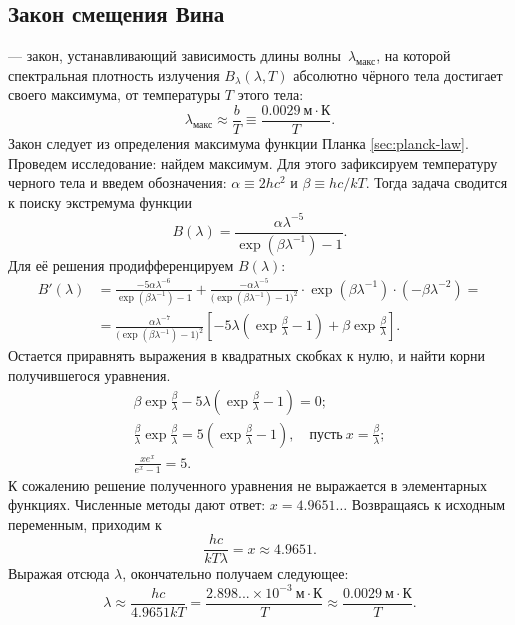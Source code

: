 \subsection{Закон смещения Вина}
 --- закон, устанавливающий зависимость длины волны~$\lambda_\text{макс}$, на которой спектральная плотность излучения $B_\lambda(\lambda, T)$ абсолютно чёрного тела достигает своего максимума, от температуры $T$ этого тела:
\begin{equation}
	\lambda_\text{макс} \approx \frac{b}{T} \equiv \frac{0.0029~\text{м} \cdot \text{К}}{T}.
\end{equation}
Закон следует из определения максимума функции Планка \eqref{sec:planck-law}.
Проведем исследование: найдем максимум. Для этого зафиксируем температуру черного тела и введем обозначения: $\alpha \equiv 2 h c^2$ и $\beta \equiv h c / k T$. Тогда задача сводится к поиску экстремума функции
\begin{equation*}
	B(\lambda) = \frac{\alpha \lambda^{-5}}{\exp \left(\beta \lambda^{-1} \right) - 1}.
\end{equation*}
Для её решения продифференцируем $B(\lambda)$:
\begin{align*}
	B'(\lambda) &= \frac{-5 \alpha \lambda^{-6}}{\exp \left(\beta \lambda^{-1} \right) - 1} + \frac{-\alpha \lambda^{-5}}{\big(\exp \left(\beta \lambda^{-1} \right) - 1\big)^2} \cdot \exp \left( \beta \lambda^{-1} \right) \cdot \left(-\beta \lambda^{-2}\right) = \\
	&= \frac{\alpha \lambda^{-7}}{\big(\exp \left(\beta \lambda^{-1} \right) - 1\big)^2} \left[ -5\lambda \left( \exp \frac{\beta}{\lambda} - 1 \right) + \beta \exp \frac{\beta}{\lambda} \right].
\end{align*}
Остается приравнять выражения в квадратных скобках к нулю, и найти корни получившегося уравнения.
\begin{gather*}
	\beta \exp \frac{\beta}{\lambda} - 5\lambda \left( \exp \frac{\beta}{\lambda} - 1 \right) = 0;\\
	\frac{\beta}{\lambda} \exp \frac{\beta}{\lambda} = 5 \left( \exp \frac{\beta}{\lambda} - 1 \right),\quad\text{пусть}~x = \frac{\beta}{\lambda};\\
	\frac{x e^x}{e^x - 1} = 5.
\end{gather*}
К сожалению решение полученного уравнения не выражается в элементарных функциях. Численные методы дают ответ: $x = 4.9651\ldots$ Возвращаясь к исходным переменным, приходим к
\begin{equation*}
	\frac{h c}{k T \lambda} = x \approx 4.9651.
\end{equation*}
Выражая отсюда $\lambda$, окончательно получаем следующее:
\begin{equation*}
	\lambda \approx \frac{h c}{4.9651 k T} = \frac{2.898... \times 10^{-3}~\text{м}\cdot\text{К}}{T} \approx  \frac{0.0029~\text{м} \cdot \text{К}}{T}.
\end{equation*}

